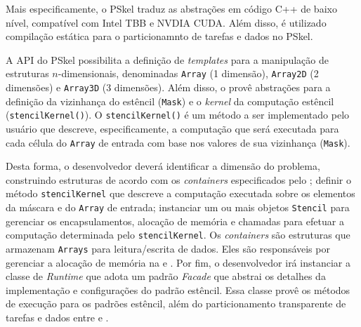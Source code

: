 Mais especificamente, o PSkel traduz as abstrações em código C++ de baixo nível, compatível com Intel TBB e NVDIA CUDA. Além disso, é utilizado compilação estática para o particionamnto de tarefas e dados no PSkel.

A API do PSkel possibilita a definição de \textit{templates} para a manipulação de estruturas $n$-dimensionais, denominadas \texttt{Array} (1 dimensão), \texttt{Array2D} (2 dimensões) e \texttt{Array3D} (3 dimensões). Além disso, o \fw provê abstrações para a definição da vizinhança do estêncil (\texttt{Mask}) e o \textit{kernel} da computação estêncil (\texttt{stencilKernel()}). O \texttt{stencilKernel()} é um método a ser implementado pelo usuário que descreve, especificamente, a computação que será executada para cada célula do \texttt{Array} de entrada com base nos valores de sua vizinhança (\texttt{Mask}).

Desta forma, o desenvolvedor deverá identificar a dimensão do problema, construindo estruturas de acordo com os \textit{containers} especificados pelo \fw; definir o método \texttt{stencilKernel} que descreve a computação executada sobre os elementos da máscara e do \texttt{Array} de entrada; instanciar um ou mais objetos \texttt{Stencil} para gerenciar os encapsulamentos, alocação de memória e chamadas para efetuar a computação determinada pelo \texttt{stencilKernel}. Os \textit{containers} são estruturas que armazenam \texttt{Arrays} para leitura/escrita de dados. Eles são responsáveis por gerenciar a alocação de memória na \cpu e \gpu.
Por fim, o desenvolvedor irá instanciar a classe de \textit{Runtime} que adota um padrão \textit{Facade} que abstrai os detalhes da implementação e configurações do padrão estêncil. Essa classe provê os métodos de execução para os padrões estêncil, além do particionamento transparente de tarefas e dados entre \cpu e \gpu.

